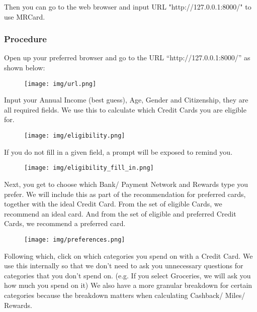 	Then you can go to the web browser and input URL "http://127.0.0.1:8000/" to use MRCard.


	\subsubsection{Procedure} %
	\label{ssub:start}
		Open up your preferred browser and go to the URL “http://127.0.0.1:8000/” as shown below:

		\begin{figure}[H]
			\centering
			\texttt{[image: img/url.png]}
		\end{figure}

		Input your Annual Income (best guess), Age, Gender and Citizenship, they are all required fields. We use this to calculate which Credit Cards you are eligible for.

		\begin{figure}[H]
			\centering
			\texttt{[image: img/eligibility.png]}
		\end{figure}

		If you do not fill in a given field, a prompt will be exposed to remind you.

		\begin{figure}[H]
			\centering
			\texttt{[image: img/eligibility\_fill\_in.png]}
		\end{figure}

		Next, you get to choose which Bank/ Payment Network and Rewards type you prefer. We will include this as part of the recommendation for preferred cards, together with the ideal Credit Card. From the set of eligible Cards, we recommend an ideal card. And from the set of eligible and preferred Credit Cards, we recommend a preferred card.

		\begin{figure}[H]
			\centering
			\texttt{[image: img/preferences.png]}
		\end{figure}

		Following which, click on which categories you spend on with a Credit Card. We use this internally so that we don’t need to ask you unnecessary questions for categories that you don’t spend on. (e.g. If you select Groceries, we will ask you how much you spend on it) We also have a more granular breakdown for certain categories because the breakdown matters when calculating Cashback/ Miles/ Rewards.

